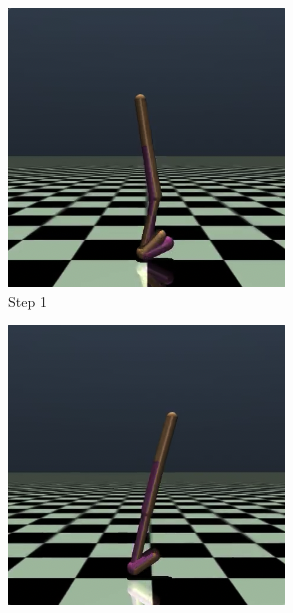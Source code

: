 \begin{figure}[h]
    \centering
    \begin{subfigure}[b]{0.24\textwidth}
        \centering
        \includegraphics[width=\textwidth]{figures/walk2d-1.png}
        \caption{Step 1}
        \label{fig:walk2d_1}
    \end{subfigure}
    \hfill
    \begin{subfigure}[b]{0.24\textwidth}
        \centering
        \includegraphics[width=\textwidth]{figures/walk2d-2.png}

\end{subfigure}
\end{figure}
